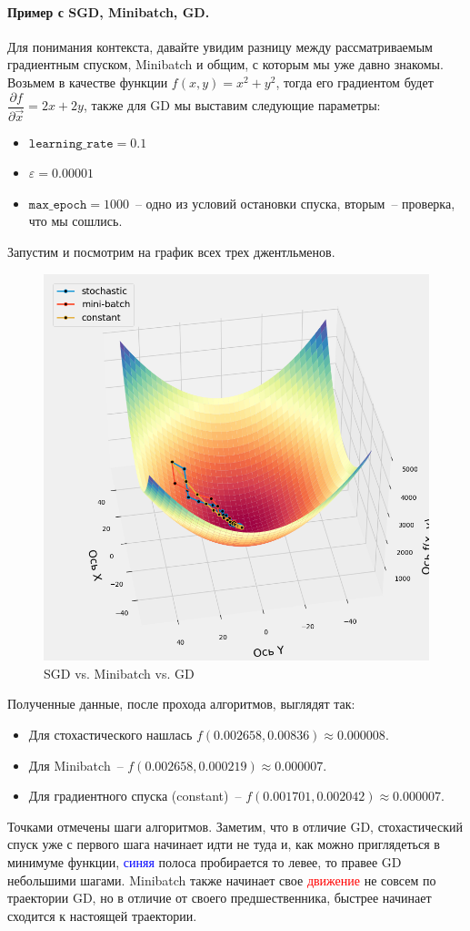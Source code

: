 \documentclass[12pt, a4paper, oneside, final]{article}
\begin{document}
	\paragraph{Пример с SGD, Minibatch, GD.}
	Для понимания контекста, давайте увидим разницу между рассматриваемым градиентным спуском, Minibatch и общим, с которым мы уже давно знакомы. Возьмем в качестве функции $f(x, y) = x^{2} + y^{2}$, тогда его градиентом будет $\dfrac{\partial{f}}{\partial{\vec{x}}} = 2x + 2y$, также для GD мы выставим следующие параметры:
	\begin{itemize}
		\item $\texttt{learning\_rate} = 0.1$
		\item $\varepsilon = 0.00001$
		\item $\texttt{max\_epoch} = 1000$~-- одно из условий остановки спуска, вторым~-- проверка, что мы сошлись.
	\end{itemize}
	Запустим и посмотрим на график всех трех джентльменов.
	\begin{figure}[H]
		\centering
		\includegraphics[scale = 0.5]{Image/T1_3d_FUNCTIONS.png}
		\caption*{SGD vs. Minibatch vs. GD}
	\end{figure}
	Полученные данные, после прохода алгоритмов, выглядят так:
	\begin{itemize}
		\item Для стохастического нашлась $f(0.002658, 0.00836) \approx 0.000008$.
		\item Для Minibatch~-- $f(0.002658, 0.000219) \approx 0.000007$.
		\item Для градиентного спуска (constant)~-- $f(0.001701, 0.002042) \approx 0.000007$.
	\end{itemize}
 	Точками отмечены шаги алгоритмов. Заметим, что в отличие GD, стохастический спуск уже с первого шага начинает идти не туда и, как можно приглядеться в минимуме функции, \textcolor{blue}{синяя} полоса пробирается то левее, то правее GD небольшими шагами. Minibatch также начинает свое \textcolor{red}{движение} не совсем по траектории GD, но в отличие от своего предшественника, быстрее начинает сходится к настоящей траектории.
\end{document}
